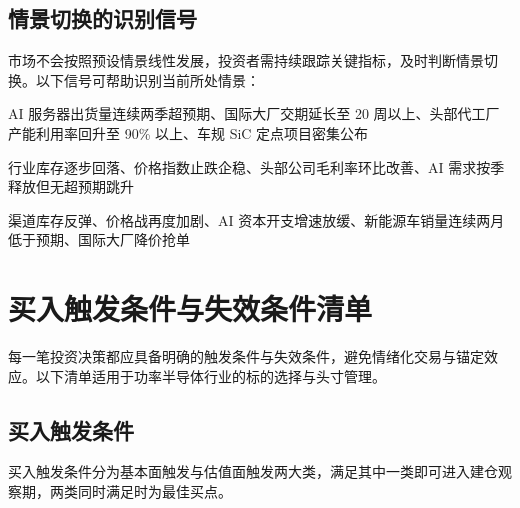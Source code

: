 \subsection{情景切换的识别信号}

市场不会按照预设情景线性发展，投资者需持续跟踪关键指标，及时判断情景切换。以下信号可帮助识别当前所处情景：

\vspace{0.2em}
\begin{description}[leftmargin=5.5em, style=nextline, font=\bfseries\color{navy}]
\item[乐观信号] AI 服务器出货量连续两季超预期、国际大厂交期延长至 20 周以上、头部代工厂产能利用率回升至 90\% 以上、车规 SiC 定点项目密集公布
\item[中性信号] 行业库存逐步回落、价格指数止跌企稳、头部公司毛利率环比改善、AI 需求按季释放但无超预期跳升
\item[悲观信号] 渠道库存反弹、价格战再度加剧、AI 资本开支增速放缓、新能源车销量连续两月低于预期、国际大厂降价抢单
\end{description}

\section{买入触发条件与失效条件清单}

每一笔投资决策都应具备明确的触发条件与失效条件，避免情绪化交易与锚定效应。以下清单适用于功率半导体行业的标的选择与头寸管理。

\subsection{买入触发条件}

买入触发条件分为基本面触发与估值面触发两大类，满足其中一类即可进入建仓观察期，两类同时满足时为最佳买点。

